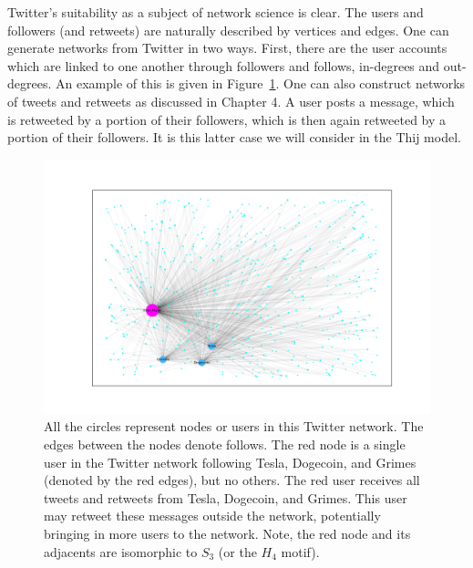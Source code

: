 Twitter's suitability as a subject of network science is clear. The users and followers (and retweets) are naturally 
described by vertices and edges. One can generate networks from Twitter in two ways.
 First, there are the user accounts which are linked to one another through 
followers and follows, in-degrees and out-degrees. An example of this is given in Figure~\ref{fig:elon_graph}. One can also construct networks
of tweets and retweets as discussed in Chapter 4. A user posts a message, which is  
retweeted by a portion of their followers, which is then again retweeted by a portion of their followers.
 It is this latter case we will consider in the Thij model.

 \begin{figure}
    \centering
        \includegraphics[width=15cm]{Images/elon_graph.png}
        \caption{All the circles represent nodes or users in this Twitter network. The edges between the nodes denote follows.
         The red node is a single user in the Twitter network following Tesla, Dogecoin, and Grimes (denoted by the red edges), but no others. The 
        red user receives all tweets and retweets from Tesla, Dogecoin, and Grimes. This user may retweet these messages
        outside the network, potentially bringing in more users to the network. Note, the red node and its adjacents are isomorphic to $S_3$ (or the $H_{4}$ motif). \label{fig:elon_graph}}
\end{figure}

